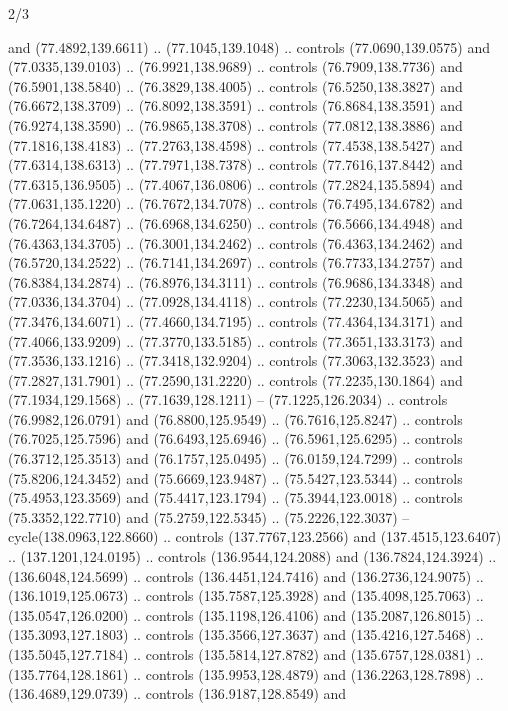 \begin{flagdescription}{2/3}
\begin{scope}[shift={(0.5\flaglength,0.5)},scale=\flagwidth/320]
\begin{scope}[y=0.8pt, x=0.8pt, yscale=-1,shift={(-118.3,-146)}]
  and (77.4892,139.6611) .. (77.1045,139.1048) .. controls (77.0690,139.0575)
  and (77.0335,139.0103) .. (76.9921,138.9689) .. controls (76.7909,138.7736)
  and (76.5901,138.5840) .. (76.3829,138.4005) .. controls (76.5250,138.3827)
  and (76.6672,138.3709) .. (76.8092,138.3591) .. controls (76.8684,138.3591)
  and (76.9274,138.3590) .. (76.9865,138.3708) .. controls (77.0812,138.3886)
  and (77.1816,138.4183) .. (77.2763,138.4598) .. controls (77.4538,138.5427)
  and (77.6314,138.6313) .. (77.7971,138.7378) .. controls (77.7616,137.8442)
  and (77.6315,136.9505) .. (77.4067,136.0806) .. controls (77.2824,135.5894)
  and (77.0631,135.1220) .. (76.7672,134.7078) .. controls (76.7495,134.6782)
  and (76.7264,134.6487) .. (76.6968,134.6250) .. controls (76.5666,134.4948)
  and (76.4363,134.3705) .. (76.3001,134.2462) .. controls (76.4363,134.2462)
  and (76.5720,134.2522) .. (76.7141,134.2697) .. controls (76.7733,134.2757)
  and (76.8384,134.2874) .. (76.8976,134.3111) .. controls (76.9686,134.3348)
  and (77.0336,134.3704) .. (77.0928,134.4118) .. controls (77.2230,134.5065)
  and (77.3476,134.6071) .. (77.4660,134.7195) .. controls (77.4364,134.3171)
  and (77.4066,133.9209) .. (77.3770,133.5185) .. controls (77.3651,133.3173)
  and (77.3536,133.1216) .. (77.3418,132.9204) .. controls (77.3063,132.3523)
  and (77.2827,131.7901) .. (77.2590,131.2220) .. controls (77.2235,130.1864)
  and (77.1934,129.1568) .. (77.1639,128.1211) -- (77.1225,126.2034) .. controls
  (76.9982,126.0791) and (76.8800,125.9549) .. (76.7616,125.8247) .. controls
  (76.7025,125.7596) and (76.6493,125.6946) .. (76.5961,125.6295) .. controls
  (76.3712,125.3513) and (76.1757,125.0495) .. (76.0159,124.7299) .. controls
  (75.8206,124.3452) and (75.6669,123.9487) .. (75.5427,123.5344) .. controls
  (75.4953,123.3569) and (75.4417,123.1794) .. (75.3944,123.0018) .. controls
  (75.3352,122.7710) and (75.2759,122.5345) .. (75.2226,122.3037) --
  cycle(138.0963,122.8660) .. controls (137.7767,123.2566) and
  (137.4515,123.6407) .. (137.1201,124.0195) .. controls (136.9544,124.2088) and
  (136.7824,124.3924) .. (136.6048,124.5699) .. controls (136.4451,124.7416) and
  (136.2736,124.9075) .. (136.1019,125.0673) .. controls (135.7587,125.3928) and
  (135.4098,125.7063) .. (135.0547,126.0200) .. controls (135.1198,126.4106) and
  (135.2087,126.8015) .. (135.3093,127.1803) .. controls (135.3566,127.3637) and
  (135.4216,127.5468) .. (135.5045,127.7184) .. controls (135.5814,127.8782) and
  (135.6757,128.0381) .. (135.7764,128.1861) .. controls (135.9953,128.4879) and
  (136.2263,128.7898) .. (136.4689,129.0739) .. controls (136.9187,128.8549) and

\end{scope}
\end{scope}
\end{flagdescription}
